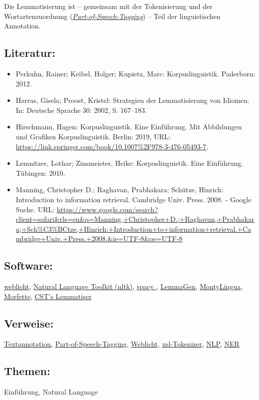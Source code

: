 \documentclass{article}
\begin{document}
        Die Lemmatisierung ist – gemeinsam mit der Tokenisierung und der Wortartenzuordnung (\emph{\href{http://gams.uni-graz.at/o:konde.156}{Part-of-Speech-Tagging}}) – Teil der linguistischen Annotation.\\
            
        \subsection*{Literatur:}\begin{itemize}\item Perkuhn, Rainer; Keibel, Holger; Kupietz, Marc: Korpuslinguistik. Paderborn: 2012.\item Harras, Gisela; Proost, Kristel: Strategien der Lemmatisierung von Idiomen. In: Deutsche Sprache 30: 2002, S. 167–183.\item Hirschmann, Hagen: Korpuslinguistik. Eine Einführung. Mit Abbildungen und Grafiken Korpuslinguistik. Berlin: 2019, URL: \url{https://link.springer.com/book/10.1007%2F978-3-476-05493-7}.\item Lemnitzer, Lothar; Zinsmeister, Heike: Korpuslinguistik. Eine Einführung. Tübingen: 2010.\item Manning, Christopher D.; Raghavan, Prabhakara; Schütze, Hinrich: Introduction to information retrieval. Cambridge Univ. Press. 2008. - Google Suche. URL: \url{https://www.google.com/search?client=safari&rls=en&q=Manning,+Christopher+D.;+Raghavan,+Prabhakara;+Sch%C3%BCtze,+Hinrich:+Introduction+to+information+retrieval.+Cambridge+Univ.+Press.+2008.&ie=UTF-8&oe=UTF-8}\end{itemize}\subsection*{Software:}\href{https://weblicht.sfs.uni-tuebingen.de/weblicht/}{weblicht}, \href{https://www.nltk.org/}{Natural Language Toolkit (nltk)}, \href{https://spacy.io/}{spacy }, \href{http://lemmatise.ijs.si/}{LemmaGen}, \href{http://alumni.media.mit.edu/~hugo/montylingua/index.html}{MontyLingua}, \href{https://sites.google.com/site/morfetteweb/}{Morfette}, \href{https://cst.dk/online/lemmatiser/uk/}{CST's Lemmatiser}\subsection*{Verweise:}\href{https://gams.uni-graz.at/o:konde.17}{Textannotation}, \href{https://gams.uni-graz.at/o:konde.156}{Part-of-Speech-Tagging}, \href{https://gams.uni-graz.at/o:konde.212}{Weblicht}, \href{https://gams.uni-graz.at/o:konde.216}{xsl-Tokenizer}, \href{https://gams.uni-graz.at/o:konde.145}{NLP}, \href{https://gams.uni-graz.at/o:konde.141}{NER}\subsection*{Themen:}Einführung, Natural Language 
\end{document}
